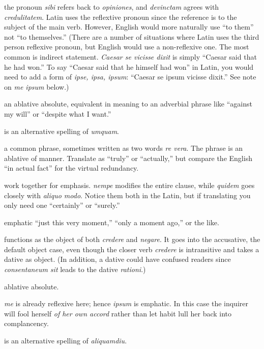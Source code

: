  the pronoun \textit{sibi} refers back to \textit{opiniones}, and \textit{devinctam} agrees with \textit{credulitatem}. Latin uses the reflextive pronoun since the reference is to the subject of the main verb. However, English would more naturally use ``to them'' not ``to themselves.'' (There are a number of situations where Latin uses the third person reflexive pronoun, but English would use a non-reflexive one. The most common is indirect statement. \textit{Caesar se vicisse dixit} is simply ``Caesar said that he had won.'' To say ``Caesar said that he himself had won'' in Latin, you would need to add a form of \textit{ipse, ipsa, ipsum}: ``Caesar se ipsum vicisse dixit.'' See note on \textit{me ipsum} below.)

 an ablative absolute, equivalent in meaning to an adverbial phrase like ``against my will'' or ``despite what I want.''

 is an alternative spelling of \textit{umquam}.

 a common phrase, sometimes written as two words \textit{re vera}. The phrase is an ablative of manner. Translate as ``truly'' or ``actually,'' but compare the English ``in actual fact'' for the virtual redundancy.

 work together for emphasis. \textit{nempe} modifies the entire clause, while \textit{quidem} goes closely with \textit{aliquo modo}. Notice them both in the Latin, but if translating you only need one ``certainly'' or ``surely.''

 emphatic ``just this very moment,'' ``only a moment ago,'' or the like.

 functions as the object of both \textit{credere} and \textit{negare}. It goes into the accusative, the default object case, even though the closer verb \textit{credere} is intransitive and takes a dative as object. (In addition, a dative could have confused readers since \textit{consentaneum sit} leads to the dative \textit{rationi}.)

 ablative absolute.

 \textit{me} is already reflexive here; hence \textit{ipsum} is emphatic. In this case the inquirer will fool herself \textit{of her own accord} rather than let habit lull her back into complancency.

 is an alternative spelling of \textit{aliquamdiu}. 

